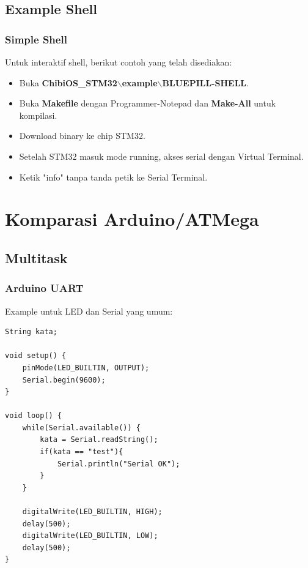 \documentclass[table,dvipsnames]{beamer}
\begin{document}
%

	\subsection{Example Shell}
	\begin{frame}
		\frametitle{Simple Shell}
		\begin{exampleblock}{}
			Untuk interaktif shell, berikut contoh yang telah disediakan:
			\begin{itemize}
				\item Buka \textbf{ChibiOS\_STM32$\backslash$example$\backslash$BLUEPILL-SHELL}.
				\item Buka \textbf{Makefile} dengan Programmer-Notepad dan \textbf{Make-All} untuk kompilasi.
				\item Download binary ke chip STM32.
				\item Setelah STM32 masuk mode running, akses serial dengan Virtual Terminal.
				\item Ketik "info" tanpa tanda petik ke Serial Terminal.
			\end{itemize}
		\end{exampleblock}
	\end{frame}

%

	\section{Komparasi Arduino/ATMega}

	\subsection{Multitask}
	\begin{frame}[fragile]
		\frametitle{Arduino UART}
		\begin{exampleblock}{}
			Example untuk LED dan Serial yang umum:
			\begin{verbatim}
String kata;

void setup() {
	pinMode(LED_BUILTIN, OUTPUT);
	Serial.begin(9600);
}

void loop() {
	while(Serial.available()) {
		kata = Serial.readString();
		if(kata == "test"){
			Serial.println("Serial OK");
		}
	}

	digitalWrite(LED_BUILTIN, HIGH);
	delay(500);
	digitalWrite(LED_BUILTIN, LOW);
	delay(500);
}
			\end{verbatim}
		\end{exampleblock}
	\end{frame}
\end{document}
